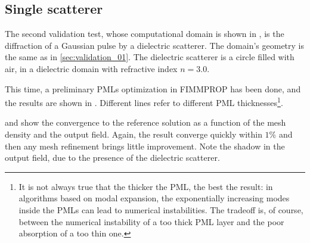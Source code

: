 \subsection{Single scatterer} \label{sec:validation_02}

The second validation test, whose computational domain is shown in
, is the diffraction of a Gaussian pulse by
a dielectric scatterer. The domain's geometry is the same as in
\ref{sec:validation_01}. The dielectric scatterer is a circle filled
with air, in a dielectric domain with refractive index $n = 3.0$.

This time, a preliminary PMLs optimization in FIMMPROP has been done,
and the results are shown in
. Different lines refer to
different PML thicknesses\footnote{It is not always true that the
  thicker the PML, the best the result: in algorithms based on modal
  expansion, the exponentially increasing modes inside the PMLs can
  lead to numerical instabilities. The tradeoff is, of course, between
the numerical instability of a too thick PML layer and the poor
absorption of a too thin one.}.

 and
 show the convergence to the reference
solution as a function of the mesh density and the output
field. Again, the result converge quickly within $1\%$ and then any
mesh refinement brings little improvement. Note the shadow in the
output field, due to the presence of the dielectric scatterer.

